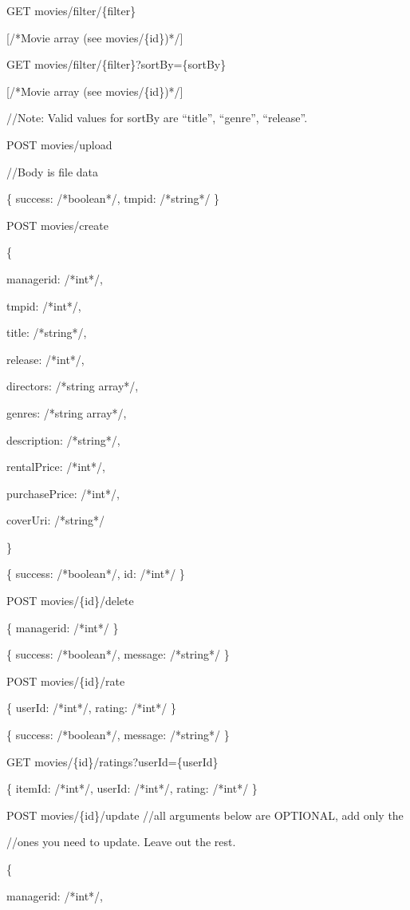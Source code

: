 GET  movies/filter/\{filter\}

    [/*Movie array (see movies/\{id\})*/]

GET  movies/filter/\{filter\}?sortBy=\{sortBy\}

    [/*Movie array (see movies/\{id\})*/]

    //Note: Valid values for sortBy are “title”, “genre”, “release”.

POST movies/upload

    //Body is file data

    \{ success: /*boolean*/, tmpid: /*string*/ \}

POST movies/create

    \{

         managerid: /*int*/,

         tmpid: /*int*/,

         title: /*string*/,

         release: /*int*/,

         directors: /*string array*/,

         genres: /*string array*/,

         description: /*string*/,

         rentalPrice: /*int*/,

         purchasePrice: /*int*/,

         coverUri: /*string*/

    \}

    \{ success: /*boolean*/, id: /*int*/ \}

POST movies/\{id\}/delete

      \{ managerid: /*int*/ \}

      \{ success: /*boolean*/, message: /*string*/ \}

POST movies/\{id\}/rate

    \{ userId: /*int*/, rating: /*int*/ \}

    \{ success: /*boolean*/, message: /*string*/ \}

GET movies/\{id\}/ratings?userId=\{userId\}

    \{ itemId: /*int*/, userId: /*int*/, rating: /*int*/ \}

POST movies/\{id\}/update //all arguments below are OPTIONAL, add only the

                      //ones you need to update. Leave out the rest.

    \{

         managerid: /*int*/,

